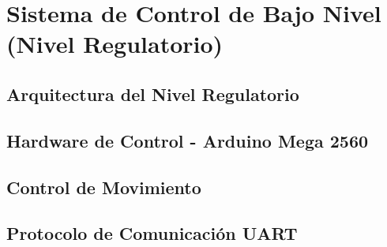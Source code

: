 \documentclass[a4paper,12pt]{report}
\begin{document}
\section{Sistema de Control de Bajo Nivel (Nivel Regulatorio)}

\subsection{Arquitectura del Nivel Regulatorio}


\subsection{Hardware de Control - Arduino Mega 2560}




% 
% 
% 

% 
% 

\subsection{Control de Movimiento}




\subsection{Protocolo de Comunicación UART}


\end{document}
